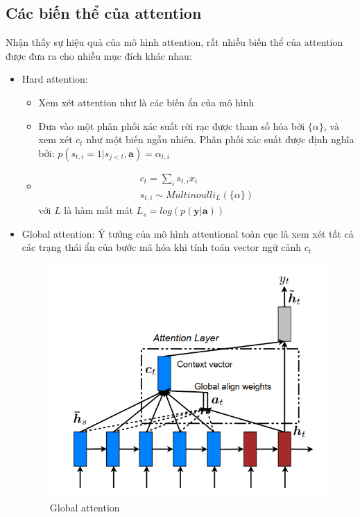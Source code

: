 \documentclass[14pt]{extreport}
\begin{document}
\subsection{Các biến thể của attention}
Nhận thấy sự hiệu quả của mô hình attention, rất nhiều biến thể của attention được đưa ra cho nhiều mục đích khác nhau:
\begin{itemize}
    \item Hard attention:
    \begin{itemize}
    \item Xem xét attention như là các biến ẩn của mô hình
    \item Đưa vào một phân phối xác suất rời rạc được tham số hóa bởi  $\{\alpha\}$, và xem xét $c_{t}$ như một biến ngẫu nhiên. Phân phối xác suất được định nghĩa bởi: $p(s_{t, i}=1|s_{j<t}, \textbf{a})= \alpha_{t, i}$
    \item 
    \begin{align}
        c_{t}= \sum_{i}s_{t,i} x_{i}\\
        s_{t,i} \sim Multinoulli_{L}(\{\alpha\})
    \end{align}
    với $L$ là hàm mất mát $L_{s}= log(p(\textbf{y|a}))$
\end{itemize}
    \item Global attention: 
    Ý tưởng của mô hình attentional toàn cục là xem xét tất cả các trạng thái ẩn của bước mã hóa khi tính toán vector ngữ cảnh $c_{t}$
    \begin{figure}
    \centering
    \includegraphics[scale=0.8]{image/global.PNG}
    \caption{Global attention }
    \label{fig:global_attention}
\end{figure}


\end{itemize}
\end{document}
